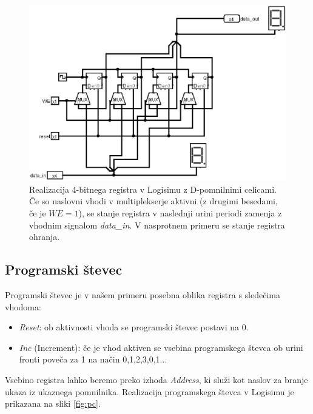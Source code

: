 \begin{figure}
\begin{center}
\includegraphics[width=0.75\columnwidth]{procesor/img/reg_4bit}%
\caption{Realizacija 4-bitnega registra v Logisimu z D-pomnilnimi celicami. Če so naslovni vhodi v multiplekserje aktivni (z drugimi besedami, če je $WE=1$), se stanje registra v naslednji urini periodi zamenja z vhodnim signalom \emph{data\_in}. V nasprotnem primeru se stanje registra ohranja.}%
\label{fig:reg_4bit}%
\end{center}
\end{figure}

\subsection{Programski števec}
Programski števec je v našem primeru posebna oblika registra s sledečima vhodoma:
\begin{itemize}
\item \emph{Reset}: ob aktivnosti vhoda se programski števec postavi na 0.
\item \emph{Inc} (Increment): če je vhod aktiven se vsebina programskega števca ob urini fronti poveča za 1 na način 0,1,2,3,0,1... 
\end{itemize}
Vsebino registra lahko beremo preko izhoda \emph{Address}, ki služi kot naslov za branje ukaza iz ukaznega pomnilnika. Realizacija programskega števca v Logisimu je prikazana na sliki \ref{fig:pc}.

